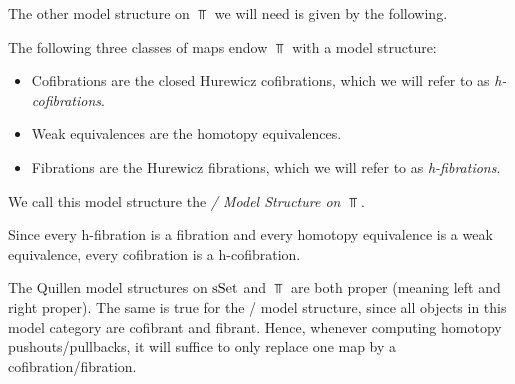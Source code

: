 The other model structure on $\Top$ we will need is given by the following.
\begin{prop}
    The following three classes of maps endow $\Top$ with a model structure:
    \begin{itemize}
        \item Cofibrations are the closed Hurewicz cofibrations, which we will refer to as \emph{h-cofibrations}.
        \item Weak equivalences are the homotopy equivalences.
        \item Fibrations are the Hurewicz fibrations, which we will refer to as \emph{h-fibrations}.
    \end{itemize}
    We call this model structure the \emph{\Strom/ Model Structure on $\Top$}.
    \begin{reference}
       \cite{Strom1972}
    \end{reference}
\end{prop}
\begin{remark}
    Since every h-fibration is a fibration and every homotopy equivalence is a weak equivalence, every cofibration is a h-cofibration.
\end{remark}
\begin{remark}[Properness]
    The Quillen model structures on $\operatorname{sSet}$ and $\Top$ are both proper (meaning left and right proper).
    The same is true for the \Strom/ model structure, since all objects in this model category are cofibrant and fibrant.
    Hence, whenever computing homotopy pushouts/pullbacks, it will suffice to only replace one map by a cofibration/fibration.
\end{remark}
